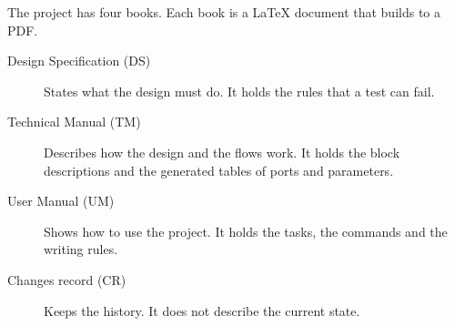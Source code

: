 The project has four books. Each book is a LaTeX document that builds to a PDF.
\begin{description}
  \item[Design Specification (DS)] States what the design must do. It holds the rules that a test can fail.
  \item[Technical Manual (TM)] Describes how the design and the flows work. It holds the block descriptions and the generated tables of ports and parameters.
  \item[User Manual (UM)] Shows how to use the project. It holds the tasks, the commands and the writing rules.
  \item[Changes record (CR)] Keeps the history. It does not describe the current state.
\end{description}

